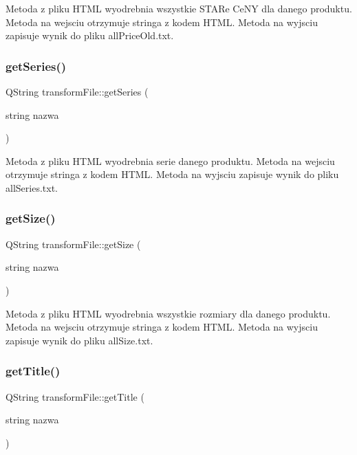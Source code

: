 Metoda z pliku H\+T\+ML wyodrebnia wszystkie S\+T\+A\+Re Ce\+NY dla danego produktu. Metoda na wejsciu otrzymuje stringa z kodem H\+T\+ML. Metoda na wyjsciu zapisuje wynik do pliku all\+Price\+Old.\+txt. \mbox{\label{classtransform_file_a2fca59437a40a6ab684a40f9837b4b1d}} 
\subsubsection{\texorpdfstring{get\+Series()}{getSeries()}}
{\footnotesize\ttfamily Q\+String transform\+File\+::get\+Series (\begin{DoxyParamCaption}\item[{string}]{nazwa }\end{DoxyParamCaption})}

Metoda z pliku H\+T\+ML wyodrebnia serie danego produktu. Metoda na wejsciu otrzymuje stringa z kodem H\+T\+ML. Metoda na wyjsciu zapisuje wynik do pliku all\+Series.\+txt. \mbox{\label{classtransform_file_a3f269bcc17e3c778d252a387424672af}} 
\subsubsection{\texorpdfstring{get\+Size()}{getSize()}}
{\footnotesize\ttfamily Q\+String transform\+File\+::get\+Size (\begin{DoxyParamCaption}\item[{string}]{nazwa }\end{DoxyParamCaption})}

Metoda z pliku H\+T\+ML wyodrebnia wszystkie rozmiary dla danego produktu. Metoda na wejsciu otrzymuje stringa z kodem H\+T\+ML. Metoda na wyjsciu zapisuje wynik do pliku all\+Size.\+txt. \mbox{\label{classtransform_file_a1cf42c937c6e8c0aae38cee401a5ac26}} 
\subsubsection{\texorpdfstring{get\+Title()}{getTitle()}}
{\footnotesize\ttfamily Q\+String transform\+File\+::get\+Title (\begin{DoxyParamCaption}\item[{string}]{nazwa }\end{DoxyParamCaption})}

